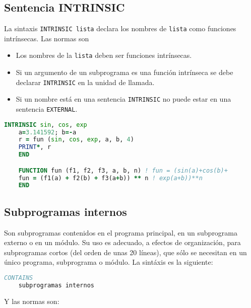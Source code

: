 \subsection{Sentencia INTRINSIC}

La sintaxis {\tt INTRINSIC lista} declara los nombres de {\tt lista} como funciones intrínsecas. Las normas son
\begin{itemize}
	\item Los nombres de la {\tt lista} deben ser funciones intrínsecas.
	\item Si un argumento de un subprograma es una función intrínseca se debe declarar {\tt INTRINSIC} en la unidad de llamada. 
	\item Si un nombre está en una sentencia {\tt INTRINSIC} no puede estar en una sentencia {\tt EXTERNAL}.
\end{itemize}

\begin{lstlisting}[language=Fortran]
	INTRINSIC sin, cos, exp
	a=3.141592; b=-a
	r = fun (sin, cos, exp, a, b, 4)
	PRINT*, r
	END

	FUNCTION fun (f1, f2, f3, a, b, n) ! fun = (sin(a)+cos(b)+
	fun = (f1(a) + f2(b) + f3(a+b)) ** n ! exp(a+b))**n	
	END
\end{lstlisting}

\subsection{Subprogramas internos}

Son subprogramas contenidos en el programa principal, en un subprograma externo o en un módulo. Su uso es adecuado, a efectos de organización, para subprogramas cortos (del orden de unas 20 líneas), que sólo se necesitan en un único programa, subprograma o módulo.  La sintáxis es la siguiente:

\begin{lstlisting}[language=Fortran]
	CONTAINS
	subprogramas internos
\end{lstlisting}
Y las normas son:

